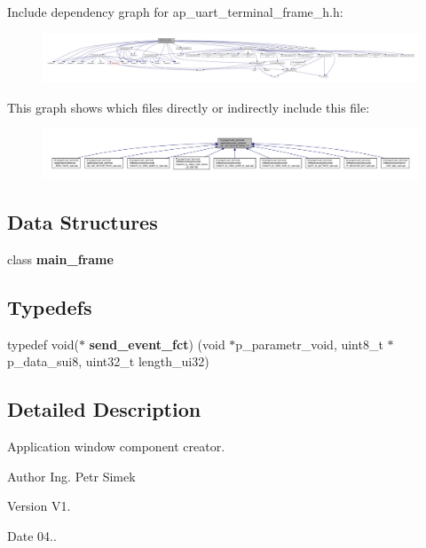 Include dependency graph for ap\+\_\+uart\+\_\+terminal\+\_\+frame\+\_\+h.\+h\+:
\nopagebreak
\begin{figure}[H]
\begin{center}
\leavevmode
\includegraphics[width=350pt]{ap__uart__terminal__frame__h_8h__incl}
\end{center}
\end{figure}
This graph shows which files directly or indirectly include this file\+:
\nopagebreak
\begin{figure}[H]
\begin{center}
\leavevmode
\includegraphics[width=350pt]{ap__uart__terminal__frame__h_8h__dep__incl}
\end{center}
\end{figure}
\subsection*{Data Structures}
\begin{DoxyCompactItemize}
\item 
class \textbf{ main\+\_\+frame}
\end{DoxyCompactItemize}
\subsection*{Typedefs}
\begin{DoxyCompactItemize}
\item 
typedef void($\ast$ \textbf{ send\+\_\+event\+\_\+fct}) (void $\ast$p\+\_\+parametr\+\_\+void, uint8\+\_\+t $\ast$p\+\_\+data\+\_\+sui8, uint32\+\_\+t length\+\_\+ui32)
\end{DoxyCompactItemize}


\subsection{Detailed Description}
Application window component creator. 

\begin{DoxyAuthor}{Author}
Ing. Petr Simek 
\end{DoxyAuthor}
\begin{DoxyVersion}{Version}
V1. 
\end{DoxyVersion}
\begin{DoxyDate}{Date}
04.. 
\end{DoxyDate}
